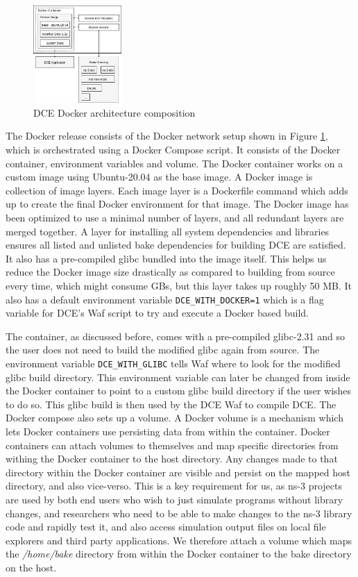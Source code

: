 \documentclass{sig-alternate}
\begin{document}
\begin{figure}[!htb]
  \centering
    \includegraphics[width=0.30\textwidth]{figs/docker-architecture.jpg}

  \caption{DCE Docker architecture composition}
  \label{fig:docker}
\end{figure}


The Docker release consists of the Docker network setup shown in Figure \ref{fig:docker}, which is orchestrated using a Docker Compose script. 
It consists of the Docker container, environment variables and volume. The Docker 
container works on a custom image using Ubuntu-20.04 as the base image. A Docker image is collection of image layers. Each image layer is a 
Dockerfile command which adds up to create the final Docker environment for that image. The Docker image has been optimized to use a minimal number of layers, and 
all redundant layers are merged together. A layer for installing all system dependencies and libraries ensures all listed and unlisted bake 
dependencies for building DCE are satisfied. It also has a pre-compiled glibc bundled into the image itself. This helps us reduce the Docker 
image size drastically as compared to building from source every time, which might consume GBs, but this layer takes up roughly 50 MB.
It also has a default environment variable 
\texttt{DCE\_WITH\_DOCKER=1} which is a flag variable for DCE's Waf script to try and execute a Docker based build.

The container, as discussed before, comes with a pre-compiled glibc-2.31 and so the user does not need to build the modified glibc again from source.
The environment variable \texttt{DCE\_WITH\_GLIBC} tells Waf where to look for the modified glibc build directory.  This environment variable can 
later be changed from inside the Docker container to point to a custom glibc build directory if the user wishes to do so. This glibc build is then 
used by the DCE Waf to compile DCE. The Docker compose also sets up a volume. A Docker volume is a mechanism which lets Docker containers 
use persisting data from within the container. Docker containers can attach volumes to themselves
and map specific directories from withing the Docker container to the host directory. Any changes made to that directory within the Docker container
are visible and persist on the mapped host directory, and also vice-verso. This is a key requirement for us, as ns-3 projects are used by both 
end users who wish to just simulate programs without library changes, and researchers who need to be able to make changes 
to the ns-3 library code and rapidly test it, and also access simulation output files on local file explorers and 
third party applications. We  therefore attach a volume which maps the \emph{/home/bake} directory from within the Docker container to the bake directory on 
the host.
\end{document}
